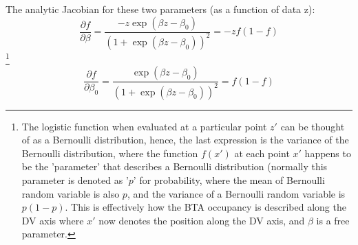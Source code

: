 The analytic Jacobian for these two parameters (as a function of data z):
\begin{equation}
\frac{\partial{ f}}{\partial{ \beta}} = \frac{-z\exp{(\beta z-\beta_0)}}{(1+\exp{(\beta z-\beta_0)})^2}=-z f(1-f)
\end{equation} \footnote{The logistic function when evaluated at a particular point $z'$ can be thought of as a Bernoulli distribution, hence, the last expression is the variance of the Bernoulli distribution, where the function $f(x')$ at each point $x'$ happens to be the 'parameter' that describes a Bernoulli distribution (normally this parameter is denoted as '$p$' for probability, where the mean of Bernoulli random variable is also $p$, and the variance of a Bernoulli random variable is $p(1-p)$.  This is effectively how the BTA occupancy is described along the DV axis where $x'$ now denotes the position along the DV axis, and $\beta$ is a free parameter.}
\begin{equation}
\frac{\partial{f}}{\partial{ \beta_0}} = \frac{\exp{(\beta z - \beta_0)}}{(1+\exp{(\beta z-\beta_0)})^2}= f(1-f)
\end{equation}
